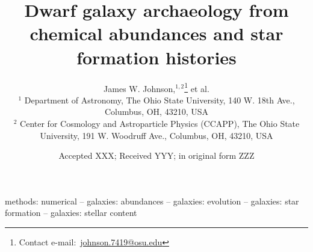 \documentclass[fleqn, usenatbib]{mnras}
\title[Dwarf Galaxy Archaeology]{Dwarf galaxy archaeology from chemical
abundances and star formation histories}
\author[J.W. Johnson et al.]{James W. Johnson,$^{1, 2}$\thanks{
	Contact e-mail:~\href{mailto:johnson.7419@osu.edu}{johnson.7419@osu.edu}}
	et al.
	\\
	$^{1}$ Department of Astronomy, The Ohio State University,
	140 W. 18th Ave., Columbus, OH, 43210, USA
	\\
	$^{2}$ Center for Cosmology and Astroparticle Physics (CCAPP),
	The Ohio State University, 191 W. Woodruff Ave., Columbus, OH, 43210, USA
}
\date{Accepted XXX; Received YYY; in original form ZZZ}
\begin{document}
\label{firstpage}
\pagerange{\pageref{firstpage}--\pageref{lastpage}}
\maketitle



\begin{keywords}
methods: numerical -- galaxies: abundances -- galaxies: evolution --
galaxies: star formation -- galaxies: stellar content
\end{keywords}













\begin{appendices}


\end{appendices}

\label{lastpage}
\end{document}
